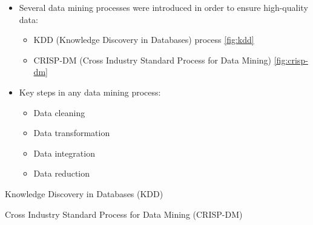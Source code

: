 \begin{frame}
	\begin{itemize}
		\item Several data mining processes were introduced in order to ensure high-quality data:
		\begin{itemize}
			\item KDD (Knowledge Discovery in Databases) process \cref{fig:kdd}
			\item CRISP-DM (Cross Industry Standard Process for Data Mining) \cref{fig:crisp-dm}
		\end{itemize}
		\item Key steps in any data mining process:
		\begin{itemize}
			\item Data cleaning
			\item Data transformation
			\item Data integration
			\item Data reduction
		\end{itemize}
	\end{itemize}

\end{frame}



\begin{dwHeaderFrame}{Knowledge Discovery in Databases (KDD)}
\end{dwHeaderFrame}


\begin{dwHeaderFrame}{Cross Industry Standard Process for Data Mining (CRISP-DM)}
\end{dwHeaderFrame}


